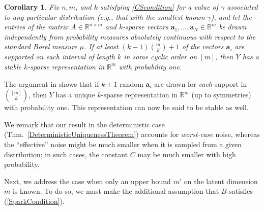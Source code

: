 \documentclass[journal, twocolumn]{IEEEtran}
\newtheorem{corollary}{Corollary}
\begin{document}

\begin{corollary}\label{ProbabilisticCor}
Fix $n, m$, and $k$ satisfying \eqref{CScondition} for a value of $\gamma$ associated to any particular distribution (e.g., that with the smallest known $\gamma$), and let the entries of the matrix $A \in \mathbb{R}^{n \times m}$ and $k$-sparse vectors $\mathbf{a}_1, \ldots, \mathbf{a}_N \in \mathbb{R}^m$ be drawn independently from probability measures absolutely continuous with respect to the standard Borel measure $\mu$. If at least $(k-1){m \choose k} + 1$ of the vectors $\mathbf{a}_i$ are supported on each interval of length $k$ in some cyclic order on $[m]$, then $Y$ has a stable $k$-sparse representation in $\mathbb{R}^m$ with probability one.
\end{corollary}

The argument in \cite{Hillar15} shows that if $k+1$ random $\mathbf{a}_i$ are drawn for \emph{each} support in ${[m] \choose k}$, then $Y$ has a unique $k$-sparse representation in $\mathbb{R}^m$ (up to symmetries) with probability one. This representation can now be said to be stable as well. %

We remark that our result in the deterministic case (Thm.~\ref{DeterministicUniquenessTheorem}) accounts for \emph{worst-case} noise, whereas the ``effective'' noise might be much smaller when it is sampled from a given distribution; in such cases, the constant $C$ may be much smaller with high probability. 

Next, we address the case when only an upper bound $m'$ on the latent dimension $m$ is known. To do so, we must make the additional assumption that $B$ satisfies (\ref{SparkCondition}). 
\end{document}
